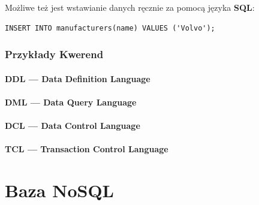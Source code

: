 \documentclass[a4paper,11pt]{article}
\begin{document}
Możliwe też jest wstawianie danych ręcznie za pomocą języka \textbf{SQL}:

\begin{verbatim}
INSERT INTO manufacturers(name) VALUES ('Volvo');
\end{verbatim}

\section*{Przykłady Kwerend}
\subsection*{DDL --- Data Definition Language}

\subsection*{DML --- Data Query Language}

\subsection*{DCL --- Data Control Language}

\subsection*{TCL --- Transaction Control Language}

\pagebreak
\part{Baza NoSQL}
\end{document}
